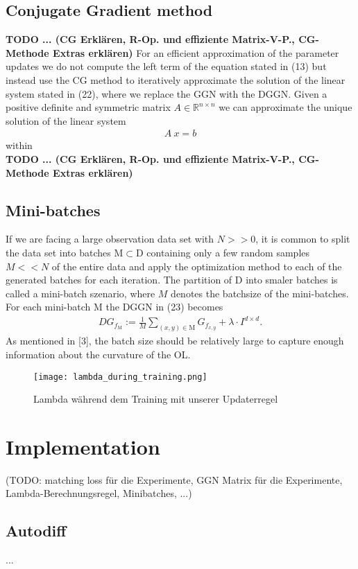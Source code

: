 \documentclass[conference]{IEEEtran}
\begin{document}
	\subsection{Conjugate Gradient method}
	\textbf{TODO ... (CG Erklären, R-Op. und effiziente Matrix-V-P., CG-Methode Extras erklären)}
	For an efficient approximation of the parameter updates we do not compute the left term of the equation stated in (13) but instead use the CG method to iteratively approximate the solution of the linear system stated in (22), where we replace the GGN with the DGGN. Given a positive definite and symmetric matrix $A\in \mathbb{R}^{n\times n}$ we can approximate the unique solution of the linear system 
	\begin{align}
	A\:x = b
	\end{align}
	within 
	\\\textbf{TODO ... (CG Erklären, R-Op. und effiziente Matrix-V-P., CG-Methode Extras erklären)}
	
	\subsection{Mini-batches}
	If we are facing a large observation data set with $N>>0$, it is common to split the data set into batches $\mathrm{M}\subset\mathrm{D}$ containing only a few random samples $M<<N$ of the entire data and apply the optimization method to each of the generated batches for each iteration. The partition of $\mathrm{D}$ into smaler batches is called a mini-batch szenario, where $M$ denotes the batchsize of the mini-batches. For each mini-batch $\mathrm{M}$ the DGGN in (23) becomes
	\begin{align}
	DG_{f_{\mathrm{M}}} := \frac{1}{M}\sum_{(x, y)\in \mathrm{M}}^{}G_{f_{x, y}} + \lambda\cdot I^{d\times d}.
	\end{align}
	As mentioned in [3], the batch size should be relatively large to capture enough information about the curvature of the OL. 
	\begin{figure}[htbp]
		\centerline{\texttt{[image: lambda\_during\_training.png]}}
		\caption{Lambda während dem Training mit unserer Updaterregel}
		\label{fig}
	\end{figure}
	\section {Implementation}
	(TODO: matching loss für die Experimente, GGN Matrix für die Experimente, Lambda-Berechnungsregel, Minibatches, ...)
	\subsection{Autodiff}
	...
\end{document}
